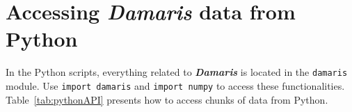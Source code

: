 \documentclass[11pt]{report}
\newcommand{\Damaris}{\emph{\textbf{Damaris}}}
\begin{document}
\noindent\begin{minipage}{\textwidth}
\vspace{0.5cm}

\end{minipage}

\section{Accessing \Damaris{} data from Python}

In the Python scripts, everything related to \Damaris{} is located in the \texttt{damaris} module. 
Use \texttt{import damaris} and \texttt{import numpy} to access these functionalities.
Table~\ref{tab:pythonAPI} presents how to access chunks of data from Python.
\end{document}
